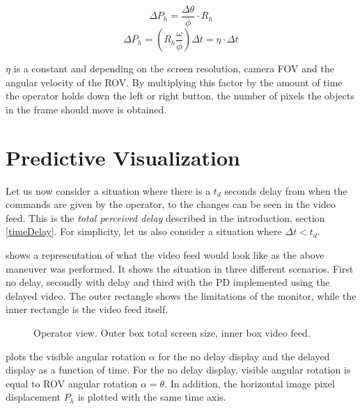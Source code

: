 \vspace{7mm}
\begin{equation}\label{deltaph}
\Delta P_h = \frac{\Delta \theta}{\phi}\cdot R_h
\end{equation}
\vspace{7mm}
\begin{equation}\label{pixelturnrate}
\Delta P_h = \left ( R_h\frac{\omega }{\phi} \right )\Delta t = \eta \cdot  \Delta t
\end{equation}
\vspace{0mm}

$\eta$ is a constant and depending on the screen resolution, camera FOV and the angular velocity of the ROV. By multiplying this factor by the amount of time the operator holds down the left or right button, the number of pixels the objects in the frame should move is obtained.

\section{Predictive Visualization}

Let us now consider a situation where there is a $t_d$ seconds delay from when the commands are given by the operator, to the changes can be seen in the video feed. This is the \emph{total perceived delay} described in the introduction, section \ref{timeDelay}. For simplicity, let us also consider a situation where $\Delta t < t_d$.

 shows a representation of what the video feed would look like as the above maneuver was performed. It shows the situation in three different scenarios. First no delay, secondly with delay and third with the PD implemented using the delayed video. The outer rectangle shows the limitations of the monitor, while the inner rectangle is the video feed itself.

\begin{figure}[h!]    
    \centering           
    \def\svgwidth{.8\columnwidth}
    
    \caption{Operator view. Outer box total screen size, inner box video feed.}
    \label{movie}
\end{figure}

 plots the visible angular rotation $\alpha$ for the no delay display and the delayed display as a function of time. For the no delay display, visible angular rotation is equal to ROV angular rotation $\alpha = \theta$. In addition, the horizontal image pixel displacement $P_h$ is plotted with the same time axis.

